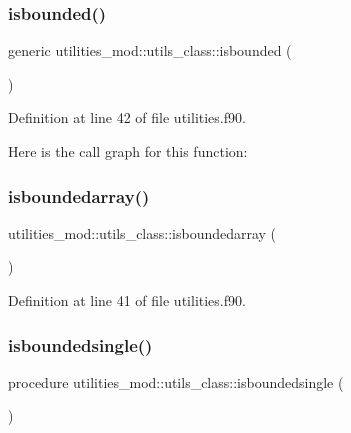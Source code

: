 \subsubsection{\texorpdfstring{isbounded()}{isbounded()}}
{\footnotesize\ttfamily generic utilities\+\_\+mod\+::utils\+\_\+class\+::isbounded (\begin{DoxyParamCaption}{ }\end{DoxyParamCaption})\hspace{0.3cm}{\ttfamily [private]}}



Definition at line 42 of file utilities.\+f90.

Here is the call graph for this function\+:
\mbox{\label{structutilities__mod_1_1utils__class_ae513529301733a624bcb1e984131edcd}} 
\subsubsection{\texorpdfstring{isboundedarray()}{isboundedarray()}}
{\footnotesize\ttfamily utilities\+\_\+mod\+::utils\+\_\+class\+::isboundedarray (\begin{DoxyParamCaption}{ }\end{DoxyParamCaption})\hspace{0.3cm}{\ttfamily [private]}}



Definition at line 41 of file utilities.\+f90.

\mbox{\label{structutilities__mod_1_1utils__class_aac36fc53d19b8bd8c37a2dfcf74f1fcc}} 
\subsubsection{\texorpdfstring{isboundedsingle()}{isboundedsingle()}}
{\footnotesize\ttfamily procedure utilities\+\_\+mod\+::utils\+\_\+class\+::isboundedsingle (\begin{DoxyParamCaption}{ }\end{DoxyParamCaption})\hspace{0.3cm}{\ttfamily [private]}}



